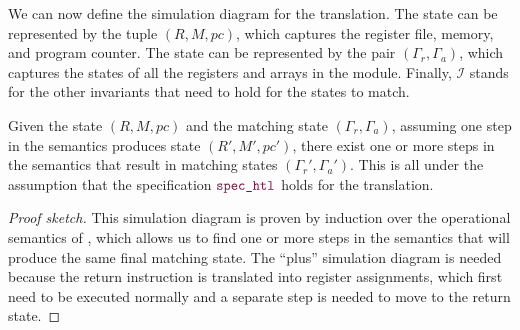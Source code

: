 We can now define the simulation diagram for the translation. The \rtlsubpar{} state can
be represented by the tuple $(R,M,\mathit{pc})$, which captures the register
file, memory, and program counter. The \htl{} state can be represented by the pair
$(\Gamma_{r}, \Gamma_{a})$, which captures the states of all the registers and
arrays in the module.  Finally, $\mathcal{I}$ stands for the other invariants
that need to hold for the states to match.

\begin{lemma}\label{lemma:simulation_diagram}
  Given the \rtlsubpar{} state $(R,M,\mathit{pc})$ and the matching \htl{} state
  $(\Gamma_{r}, \Gamma_{a})$, assuming one step in the \rtlsubpar{} semantics produces
  state $(R',M',\mathit{pc}')$, there exist one or more steps in the \htl{}
  semantics that result in matching states $(\Gamma_{r}', \Gamma_{a}')$.  This
  is all under the assumption that the specification {\normalfont $\yhfunction{spec\_{htl}}$}
  holds for the translation.

  {\normalfont\begin{center}
  \end{center}}
\end{lemma}

\begin{proof}[Proof sketch]
  This simulation diagram is proven by induction over the operational semantics
  of \rtlsubpar{}, which allows us to find one or more steps in the \htl{}
  semantics that will produce the same final matching state.  The \enquote{plus}
  simulation diagram is needed because the return instruction is translated into
  register assignments, which first need to be executed normally and a separate
  step is needed to move to the return state.
\end{proof}

